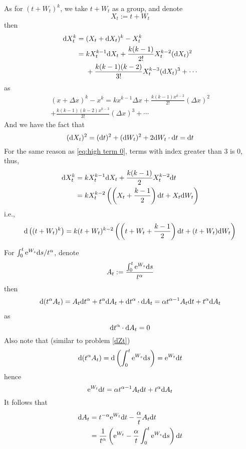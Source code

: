\documentclass{homework}
\begin{document}
    As for $(t+W_t)^k$, we take $t+W_t$ as a group, and denote
    \[X_t:=t+W_t\]
    then
    \[\begin{aligned}
        \mathrm d X_t^k&=(X_t+\mathrm d X_t)^k-X_t^k\\
        &=\begin{aligned}[t]
        &kX_t^{k-1}\mathrm d X_t+\frac{k(k-1)}{2!}X_t^{k-2}(\mathrm d X_t)^2\\
        &+\frac{k(k-1)(k-2)}{3!}X_t^{k-3}(\mathrm d X_t)^3+\cdots
        \end{aligned}
    \end{aligned}\]
    as
    \begin{multline*}
        (x+\Delta x)^k-x^k=kx^{k-1}\Delta x
        +\frac{k(k-1)x^{k-2}}{2!}(\Delta x)^2\\
        +\frac{k(k-1)(k-2)x^{k-3}}{3!}(\Delta x)^3+\cdots
    \end{multline*}
    And we have the fact that
    \[(\mathrm d X_t)^2=(\mathrm d t)^2+(\mathrm d W_t)^2+2\mathrm d W_t\cdot\mathrm d t
    =\mathrm d t\]
    For the same reason as \cref{eq:high term 0}, terms with index
    greater than 3 is 0, thus,
    \[\begin{aligned}
        \mathrm d X_t^k&=kX_t^{k-1}\mathrm d X_t+\frac{k(k-1)}{2}X_t^{k-2}\mathrm d t\\
        &=kX_t^{k-2}\left(\left(X_t+\frac{k-1}{2}\right)\mathrm d t+X_t\mathrm d W_t\right)
    \end{aligned}\]
    i.e.,
    \[\mathrm d \left((t+W_t)^k\right)=
    k(t+W_t)^{k-2}
    \left(\left(t+W_t+\frac{k-1}{2}\right)\mathrm d t
    +(t+W_t)\mathrm d W_t\right)
    \]

    For $\int_0^t\mathrm e^{W_s}\mathrm d s/t^\alpha$, denote
    \[A_t:=\frac{\int_0^t\mathrm e^{W_s}\mathrm d s}{t^\alpha}\]
    then
    \[\begin{aligned}
        \mathrm d(t^\alpha A_t)=A_t\mathrm d t^\alpha+t^\alpha\mathrm d A_t
        +\mathrm d t^\alpha\cdot\mathrm d A_t
        =\alpha t^{\alpha-1}A_t\mathrm d t+t^\alpha\mathrm d A_t
    \end{aligned}\]
    as
    \[\mathrm d t^\alpha\cdot\mathrm d A_t=0\]
    Also note that (similar to problem \ref{dZt})
    \[\mathrm d (t^\alpha A_t)=\mathrm d\left(\int_0^t\mathrm e^{W_s}\mathrm d s\right)
    =\mathrm e^{W_t}\mathrm d t\]
    hence
    \[\mathrm e^{W_t}\mathrm d t=\alpha t^{\alpha-1}A_t\mathrm d t+t^\alpha\mathrm d A_t\]
    It follows that
    \[\begin{aligned}
        \mathrm d A_t&=t^{-\alpha}\mathrm e^{W_t}\mathrm d t-\frac{\alpha}{t}A_t\mathrm d t\\
        &=\frac{1}{t^\alpha}\left(
            \mathrm e^{W_t}-\frac{\alpha}{t}\int_0^t\mathrm e^{W_s}\mathrm d s
        \right)\mathrm d t
    \end{aligned}\]
\end{document}
